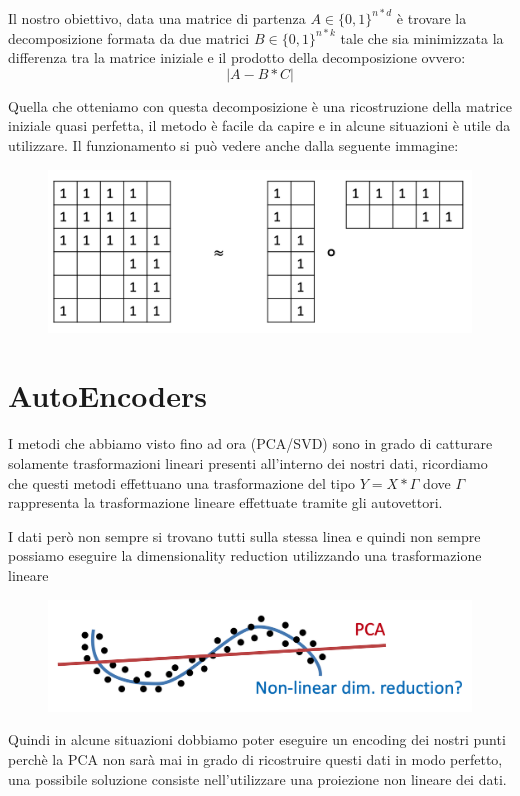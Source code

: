 \documentclass[14pt]{extreport}
\begin{document}
Il nostro obiettivo, data una matrice di partenza $A \in \{0,1\}^{n*d}$ è trovare la decomposizione formata da due matrici $B \in \{0,1\}^{n*k}$ tale che 
sia minimizzata la differenza tra la matrice iniziale e il prodotto della decomposizione ovvero: $$|A-B*C|$$

Quella che otteniamo con questa decomposizione è una ricostruzione della matrice iniziale quasi perfetta, il metodo è facile da capire e in alcune situazioni
è utile da utilizzare.
Il funzionamento si può vedere anche dalla seguente immagine:

\begin{figure}[H] 
\centering
\includegraphics[width=0.7\linewidth]{530.jpeg}
\end{figure}

\section{AutoEncoders}

I metodi che abbiamo visto fino ad ora (PCA/SVD) sono in grado di catturare solamente trasformazioni lineari presenti all'interno dei nostri dati, ricordiamo che 
questi metodi effettuano una trasformazione del tipo $Y = X * \Gamma$ dove $\Gamma$ rappresenta la trasformazione lineare effettuate tramite gli autovettori.

I dati però non sempre si trovano tutti sulla stessa linea e quindi non sempre possiamo eseguire la dimensionality reduction utilizzando una trasformazione lineare

\begin{figure}[H] 
\centering
\includegraphics[width=0.7\linewidth]{531.jpeg}
\end{figure}

Quindi in alcune situazioni dobbiamo poter eseguire un encoding dei nostri punti perchè la PCA non sarà mai in grado di ricostruire questi dati
in modo perfetto, una possibile soluzione consiste nell'utilizzare una proiezione non lineare dei dati.
\end{document}
